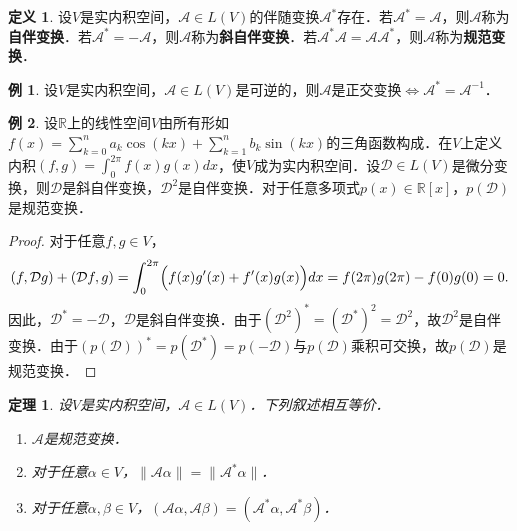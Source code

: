 \documentclass[a4paper,fontset=windows]{ctexbook}
\newtheorem{theorem}{定理}[chapter]
\theoremstyle{definition}
\newtheorem{definition}{定义}[chapter]
\newtheorem{example}{例}[chapter]
\begin{document}
\begin{definition}
设$V$是实内积空间，$\mathcal{A}\in L(V)$的伴随变换$\mathcal{A}^*$存在．若$\mathcal{A}^*=\mathcal{A}$，则$\mathcal{A}$称为{\bf 自伴变换}．若$\mathcal{A}^*=-\mathcal{A}$，则$\mathcal{A}$称为{\bf 斜自伴变换}．若$\mathcal{A}^*\mathcal{A}=\mathcal{A}\mathcal{A}^*$，则$\mathcal{A}$称为{\bf 规范变换}．
\end{definition}

\begin{example}
设$V$是实内积空间，$\mathcal{A}\in L(V)$是可逆的，则$\mathcal{A}$是正交变换$\Leftrightarrow\mathcal{A}^*=\mathcal{A}^{-1}$．
\end{example}

\begin{example}
设$\mathbb{R}$上的线性空间$V$由所有形如$f(x)=\sum\limits_{k=0}^na_k\cos(kx)+\sum\limits_{k=1}^nb_k\sin(kx)$的三角函数构成．在$V$上定义内积$(f,g)=\int_0^{2\pi}f(x)g(x)dx$，使$V$成为实内积空间．设$\mathcal{D}\in L(V)$是微分变换，则$\mathcal{D}$是斜自伴变换，$\mathcal{D}^2$是自伴变换．对于任意多项式$p(x)\in\mathbb{R}[x]$，$p(\mathcal{D})$是规范变换．
\end{example}

\begin{proof}
对于任意$f,g\in V$，
$$(f,\mathcal{D}g)+(\mathcal{D}f,g)=\int_0^{2\pi}\Bigl(f(x)g'(x)+f'(x)g(x)\Bigr)dx=f(2\pi)g(2\pi)-f(0)g(0)=0.$$
因此，$\mathcal{D}^*=-\mathcal{D}$，$\mathcal{D}$是斜自伴变换．由于$(\mathcal{D}^2)^*=(\mathcal{D}^*)^2=\mathcal{D}^2$，故$\mathcal{D}^2$是自伴变换．由于$(p(\mathcal{D}))^*=p(\mathcal{D}^*)=p(-\mathcal{D})$与$p(\mathcal{D})$乘积可交换，故$p(\mathcal{D})$是规范变换．
\end{proof}

\begin{theorem}
设$V$是实内积空间，$\mathcal{A}\in L(V)$．下列叙述相互等价．
\begin{enumerate}
\item $\mathcal{A}$是规范变换．

\item 对于任意$\alpha\in V$，$\|\mathcal{A}\alpha\|=\|\mathcal{A}^*\alpha\|$．

\item 对于任意$\alpha,\beta\in V$，$(\mathcal{A}\alpha,\mathcal{A}\beta)=(\mathcal{A}^*\alpha,\mathcal{A}^*\beta)$．
\end{enumerate}
\end{theorem}
\end{document}
